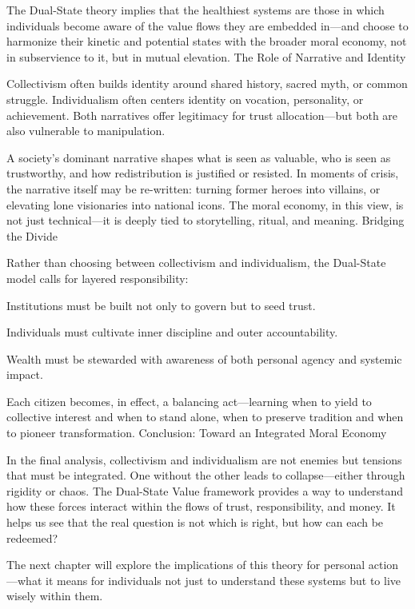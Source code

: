 \documentclass[11pt,oneside]{book}
\begin{document}
The Dual-State theory implies that the healthiest systems are those in which individuals become aware of the value flows they are embedded in—and choose to harmonize their kinetic and potential states with the broader moral economy, not in subservience to it, but in mutual elevation.
The Role of Narrative and Identity

Collectivism often builds identity around shared history, sacred myth, or common struggle. Individualism often centers identity on vocation, personality, or achievement. Both narratives offer legitimacy for trust allocation—but both are also vulnerable to manipulation.

A society’s dominant narrative shapes what is seen as valuable, who is seen as trustworthy, and how redistribution is justified or resisted. In moments of crisis, the narrative itself may be re-written: turning former heroes into villains, or elevating lone visionaries into national icons. The moral economy, in this view, is not just technical—it is deeply tied to storytelling, ritual, and meaning.
Bridging the Divide

Rather than choosing between collectivism and individualism, the Dual-State model calls for layered responsibility:

    Institutions must be built not only to govern but to seed trust.

    Individuals must cultivate inner discipline and outer accountability.

    Wealth must be stewarded with awareness of both personal agency and systemic impact.

Each citizen becomes, in effect, a balancing act—learning when to yield to collective interest and when to stand alone, when to preserve tradition and when to pioneer transformation.
Conclusion: Toward an Integrated Moral Economy

In the final analysis, collectivism and individualism are not enemies but tensions that must be integrated. One without the other leads to collapse—either through rigidity or chaos. The Dual-State Value framework provides a way to understand how these forces interact within the flows of trust, responsibility, and money. It helps us see that the real question is not which is right, but how can each be redeemed?

The next chapter will explore the implications of this theory for personal action—what it means for individuals not just to understand these systems but to live wisely within them.
\end{document}
